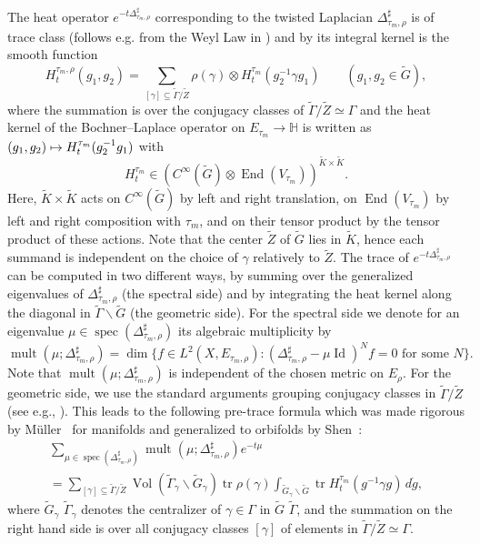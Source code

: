 \documentclass[JEP,XML,SOM,Unicode,NoFloatCountersInSection,published]{cedram}
\newcommand\mto{\mathchoice{\longmapsto}{\mapsto}{\mapsto}{\mapsto}}
\theoremstyle{plain}
\theoremstyle{definition}
\theoremstyle{remark}
\renewcommand{\H}{\mathbb{H}}
\DeclareMathOperator{\tr}{tr}
\DeclareMathOperator{\End}{End}
\DeclareMathOperator{\Vol}{Vol}
\DeclareMathOperator{\Id}{Id}
\DeclareMathOperator{\spec}{spec}
\numberwithin{equation}{section}
\DeclareMathOperator{\mult}{mult}
\begin{document}
The heat operator $e^{-t\Delta_{\tau_m,\rho}^\sharp}$ corresponding to the twisted Laplacian $\Delta_{\tau_m,\rho}^\sharp$ is of trace class (follows e.g. from the Weyl Law in \cite[Lem.\,2.2]{M1}) and by \cite[Eq.\,(5.6)]{M1} its integral kernel is the smooth function
\[
H_t^{\tau_m,\rho}(g_1,g_2) = \sum_{[\gamma]\subseteq\widetilde{\Gamma}/\widetilde{Z}} \rho(\gamma)\otimes H_t^{\tau_m}(g_2^{-1}\gamma g_1) \qquad (g_1,g_2\in\widetilde{G}),
\]
where the summation is over the conjugacy classes of $\widetilde{\Gamma}/\widetilde{Z}\simeq\Gamma$ and the heat kernel of the Bochner--Laplace operator on $E_{\tau_m}\to\H$ is written as $(g_1,g_2)\mto H_t^{\tau_m}(g_2^{-1}g_1)$ with
\[
H_t^{\tau_m}\in(C^\infty(\widetilde{G})\otimes\End(V_{\tau_m}))^{\widetilde{K}\times\widetilde{K}}.
\]
Here, $\widetilde{K}\times\widetilde{K}$ acts on $C^\infty(\widetilde{G})$ by left and right translation, on $\End(V_{\tau_m})$ by left and right composition with $\tau_m$, and on their tensor product by the tensor product of these actions. Note that the center $\widetilde Z$ of $\widetilde G$ lies in $\widetilde K$, hence each summand is independent on the choice of $\gamma$ relatively to $\widetilde Z$. The trace of $e^{-t\Delta_{\tau_m,\rho}^\sharp}$ can be computed in two different ways, by summing over the generalized eigenvalues of $\Delta_{\tau_m,\rho}^\sharp$ (the spectral side) and by integrating the heat kernel along the diagonal in $\widetilde{\Gamma}\backslash\widetilde{G}$ (the geometric side). For the spectral side we denote for an eigenvalue $\mu\in\spec(\Delta_{\tau_m,\rho}^\sharp)$ its algebraic multiplicity by
\[
\mult(\mu;\Delta_{\tau_m,\rho}^\sharp) = \dim\{f\in L^2(X,E_{\tau_m,\rho}):(\Delta_{\tau_m,\rho}^\sharp-\mu\Id)^Nf=0\mbox{ for some }N\}.
\]
Note that $\mult(\mu;\Delta_{\tau_m,\rho}^\sharp)$ is independent of the chosen metric on $E_\rho$. For the geometric side, we use the standard arguments grouping conjugacy classes in $\widetilde{\Gamma}/\widetilde{Z}$ (see e.g., \cite[\S 2]{Wa}). This leads to the following pre-trace formula which was made rigorous by Müller~\cite[Prop.\,5.1]{M1} for manifolds and generalized to orbifolds by Shen~\cite[Th.\,7.1]{Shen2020}:
\begin{multline}
\sum_{\mu\in\spec(\Delta_{\tau_m,\rho}^\sharp)}\mult(\mu;\Delta_{\tau_m,\rho}^\sharp)e^{-t\mu}\\[-10pt]
= \sum_{[\gamma]\subseteq\widetilde{\Gamma}/\widetilde{Z}}\Vol(\widetilde{\Gamma}_\gamma\backslash\widetilde{G}_\gamma)\tr{\rho(\gamma)}\int_{\widetilde{G}_\gamma\backslash\widetilde{G}}\tr H_t^{\tau_m}(g^{-1}\gamma g)\,d\dot{g},\label{eq:PreTrace}
\end{multline}
where $\widetilde{G}_\gamma$ \resp $\widetilde{\Gamma}_\gamma$ denotes the centralizer of $\gamma\in\Gamma$ in $\widetilde{G}$ \resp $\widetilde{\Gamma}$, and the summation on the right hand side is over all conjugacy classes $[\gamma]$ of elements in $\widetilde{\Gamma}/\widetilde{Z}\simeq\Gamma$.
\end{document}
